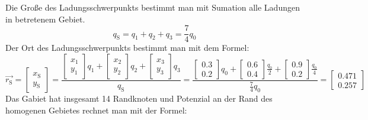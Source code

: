 \documentclass[Protokollheft.tex]{subfiles}
\begin{document}
Die Große des Ladungsschwerpunkts bestimmt man mit Sumation alle Ladungen in betretenem Gebiet.
$$ q_{\text{S}}=q_1 + q_2 + q_3= \frac{7}{4}q_0 $$
Der Ort des Ladungsschwerpunkts bestimmt man mit dem Formel:
$$\vec{r_\text{S}}=\begin{bmatrix}
x_{\text{S}} \\
 y_{\text{S}}  
\end{bmatrix}=
\frac{\begin{bmatrix}
	x_{\text{1}} \\
	y_{\text{1}}  
	\end{bmatrix}q_1+
\begin{bmatrix}
x_{\text{2}} \\
y_{\text{2}}  
\end{bmatrix}q_2+
\begin{bmatrix}
x_{\text{3}} \\
y_{\text{3}}  
\end{bmatrix}q_3}{q_{\text{S}}}=
\frac{\begin{bmatrix}
	0.3 \\
	0.2  
	\end{bmatrix}q_0+
	\begin{bmatrix}
	0.6 \\
	0.4  
	\end{bmatrix}\frac{q_0}{2}+
	\begin{bmatrix}
	0.9 \\
	0.2  
	\end{bmatrix}\frac{q_0}{4}}{\frac{7}{4}q_0}=
\begin{bmatrix}
0.471 \\
0.257  
\end{bmatrix}
$$
Das Gabiet hat insgesamt 14 Randknoten und Potenzial an der Rand des homogenen Gebietes rechnet man mit der Formel:
\end{document}
